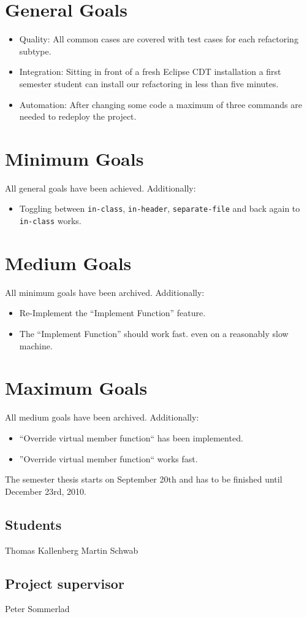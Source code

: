 \documentclass[a4paper,10pt]{scrreprt}
\begin{document}
\pagebreak

\section*{General Goals}

\begin{itemize}
 \item Quality: All common cases are covered with test cases for each
refactoring subtype.
 \item Integration: Sitting in front of a fresh Eclipse CDT installation a first
semester student can install our refactoring in less than five minutes.
 \item Automation: After changing some code a maximum of three commands are
needed to redeploy the project.
\end{itemize}

\section*{Minimum Goals}

All general goals have been achieved. Additionally:
\begin{itemize}
 \item Toggling between \texttt{in-class}, \texttt{in-header},
\texttt{separate-file} and back again to \texttt{in-class} works.
\end{itemize}

\section*{Medium Goals}
All minimum goals have been archived. Additionally:
\begin{itemize}
 \item Re-Implement the ``Implement Function'' feature.
 \item The ``Implement Function'' should work fast. even on a reasonably
slow machine. %
\end{itemize}

\section*{Maximum Goals}
All medium goals have been archived. Additionally:
\begin{itemize}
 \item ``Override virtual member function`` has been implemented.
 \item ''Override virtual member function`` works fast.\newline
\end{itemize}

The semester thesis starts on September 20th and has to be finished until
December 23rd, 2010.

\subsection*{Students}
Thomas Kallenberg \dotfill
Martin Schwab \dotfill
\subsection*{Project supervisor}
Peter Sommerlad \dotfill
~ \newline 
\end{document}
